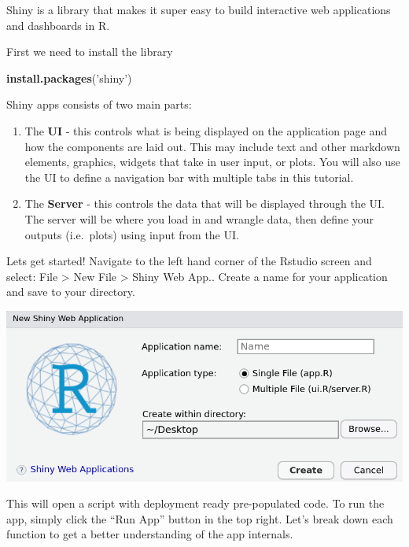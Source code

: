 \documentclass[
]{book}
\newenvironment{Shaded}{\begin{snugshade}}{\end{snugshade}}
\newcommand{\KeywordTok}[1]{\textcolor[rgb]{0.13,0.29,0.53}{\textbf{#1}}}
\newcommand{\NormalTok}[1]{#1}
\newcommand{\StringTok}[1]{\textcolor[rgb]{0.31,0.60,0.02}{#1}}
\begin{document}
Shiny is a library that makes it super easy to build interactive web applications and dashboards in R.

First we need to install the library

\begin{Shaded}
\begin{Highlighting}[]
\KeywordTok{install.packages}\NormalTok{(}\StringTok{'shiny'}\NormalTok{)}
\end{Highlighting}
\end{Shaded}

Shiny apps consists of two main parts:

\begin{enumerate}
\def\labelenumi{\arabic{enumi})}
\item
  The \textbf{UI} - this controls what is being displayed on the application page and how the components are laid out. This may include text and other markdown elements, graphics, widgets that take in user input, or plots. You will also use the UI to define a navigation bar with multiple tabs in this tutorial.
\item
  The \textbf{Server} - this controls the data that will be displayed through the UI. The server will be where you load in and wrangle data, then define your outputs (i.e.~plots) using input from the UI.
\end{enumerate}

Lets get started! Navigate to the left hand corner of the Rstudio screen and select: File \textgreater{} New File \textgreater{} Shiny Web App.. Create a name for your application and save to your directory.

\includegraphics{img/new_shiny_app.png}

This will open a script with deployment ready pre-populated code. To run the app, simply click the ``Run App'' button in the top right. Let's break down each function to get a better understanding of the app internals.
\end{document}

